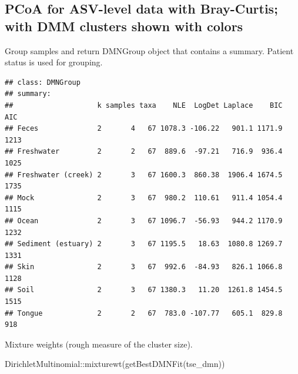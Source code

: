 \documentclass[
]{book}
\newenvironment{Shaded}{\begin{snugshade}}{\end{snugshade}}
\newcommand{\AttributeTok}[1]{\textcolor[rgb]{0.77,0.63,0.00}{#1}}
\newcommand{\DecValTok}[1]{\textcolor[rgb]{0.00,0.00,0.81}{#1}}
\newcommand{\FunctionTok}[1]{\textcolor[rgb]{0.00,0.00,0.00}{#1}}
\newcommand{\NormalTok}[1]{#1}
\newcommand{\OtherTok}[1]{\textcolor[rgb]{0.56,0.35,0.01}{#1}}
\newcommand{\SpecialCharTok}[1]{\textcolor[rgb]{0.00,0.00,0.00}{#1}}
\newcommand{\StringTok}[1]{\textcolor[rgb]{0.31,0.60,0.02}{#1}}
\begin{document}
\hypertarget{pcoa-for-asv-level-data-with-bray-curtis-with-dmm-clusters-shown-with-colors}{%
\subsection{PCoA for ASV-level data with Bray-Curtis; with DMM clusters shown with colors}\label{pcoa-for-asv-level-data-with-bray-curtis-with-dmm-clusters-shown-with-colors}}

Group samples and return DMNGroup object that contains a summary.
Patient status is used for grouping.

\begin{Shaded}
\end{Shaded}

\begin{verbatim}
## class: DMNGroup 
## summary:
##                    k samples taxa    NLE  LogDet Laplace    BIC  AIC
## Feces              2       4   67 1078.3 -106.22   901.1 1171.9 1213
## Freshwater         2       2   67  889.6  -97.21   716.9  936.4 1025
## Freshwater (creek) 2       3   67 1600.3  860.38  1906.4 1674.5 1735
## Mock               2       3   67  980.2  110.61   911.4 1054.4 1115
## Ocean              2       3   67 1096.7  -56.93   944.2 1170.9 1232
## Sediment (estuary) 2       3   67 1195.5   18.63  1080.8 1269.7 1331
## Skin               2       3   67  992.6  -84.93   826.1 1066.8 1128
## Soil               2       3   67 1380.3   11.20  1261.8 1454.5 1515
## Tongue             2       2   67  783.0 -107.77   605.1  829.8  918
\end{verbatim}

Mixture weights (rough measure of the cluster size).

\begin{Shaded}
\begin{Highlighting}[]
\NormalTok{DirichletMultinomial}\SpecialCharTok{::}\FunctionTok{mixturewt}\NormalTok{(}\FunctionTok{getBestDMNFit}\NormalTok{(tse\_dmn))}
\end{Highlighting}
\end{Shaded}
\end{document}
